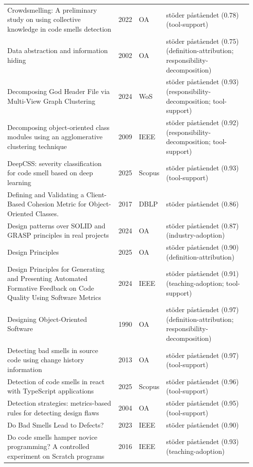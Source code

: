\begin{longtable}{@{}%
  >{\raggedright\arraybackslash}p{}c%
  >{\raggedright\arraybackslash}p{}%
  >{\raggedright\arraybackslash}p{}@{}}
Crowdsmelling: A preliminary study on using collective knowledge in code smells detection & 2022 & OA & stöder påståendet (0.78) (tool-support) \\
Data abstraction and information hiding & 2002 & OA & stöder påståendet (0.75) (definition-attribution; responsibility-decomposition) \\
Decomposing God Header File via Multi-View Graph Clustering & 2024 & WoS & stöder påståendet (0.93) (responsibility-decomposition; tool-support) \\
Decomposing object-oriented class modules using an agglomerative clustering technique & 2009 & IEEE & stöder påståendet (0.92) (responsibility-decomposition; tool-support) \\
DeepCSS: severity classification for code smell based on deep learning & 2025 & Scopus & stöder påståendet (0.93) (tool-support) \\
Defining and Validating a Client-Based Cohesion Metric for Object-Oriented Classes. & 2017 & DBLP & stöder påståendet (0.86) \\
Design patterns over SOLID and GRASP principles in real projects & 2024 & OA & stöder påståendet (0.87) (industry-adoption) \\
Design Principles & 2025 & OA & stöder påståendet (0.90) (definition-attribution) \\
Design Principles for Generating and Presenting Automated Formative Feedback on Code Quality Using Software Metrics & 2024 & IEEE & stöder påståendet (0.91) (teaching-adoption; tool-support) \\
Designing Object-Oriented Software & 1990 & OA & stöder påståendet (0.97) (definition-attribution; responsibility-decomposition) \\
Detecting bad smells in source code using change history information & 2013 & OA & stöder påståendet (0.97) (tool-support) \\
Detection of code smells in react with TypeScript applications & 2025 & Scopus & stöder påståendet (0.96) (tool-support) \\
Detection strategies: metrics-based rules for detecting design flaws & 2004 & OA & stöder påståendet (0.95) (tool-support) \\
Do Bad Smells Lead to Defects? & 2023 & IEEE & stöder påståendet (0.90) \\
Do code smells hamper novice programming? A controlled experiment on Scratch programs & 2016 & IEEE & stöder påståendet (0.93) (teaching-adoption) \\

\end{longtable}
